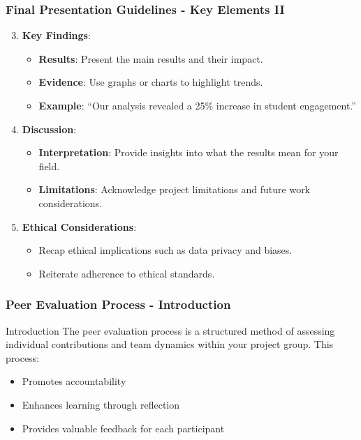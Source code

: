 \documentclass[aspectratio=169]{beamer}
\begin{document}
\begin{frame}[fragile]
    \frametitle{Final Presentation Guidelines - Key Elements II}
    \begin{enumerate}
        \setcounter{enumi}{2}
        \item \textbf{Key Findings}:
            \begin{itemize}
                \item \textbf{Results}: Present the main results and their impact.
                \item \textbf{Evidence}: Use graphs or charts to highlight trends.
                \item \textbf{Example}: “Our analysis revealed a 25\% increase in student engagement.”
            \end{itemize}
        
        \item \textbf{Discussion}:
            \begin{itemize}
                \item \textbf{Interpretation}: Provide insights into what the results mean for your field.
                \item \textbf{Limitations}: Acknowledge project limitations and future work considerations.
            \end{itemize}
        
        \item \textbf{Ethical Considerations}:
            \begin{itemize}
                \item Recap ethical implications such as data privacy and biases.
                \item Reiterate adherence to ethical standards.
            \end{itemize}
    \end{enumerate}
\end{frame}

\begin{frame}[fragile]
    \frametitle{Peer Evaluation Process - Introduction}
    \begin{block}{Introduction}
        The peer evaluation process is a structured method of assessing individual contributions and team dynamics within your project group. This process:
        \begin{itemize}
            \item Promotes accountability
            \item Enhances learning through reflection
            \item Provides valuable feedback for each participant
        \end{itemize}
    \end{block}
\end{frame}
\end{document}
